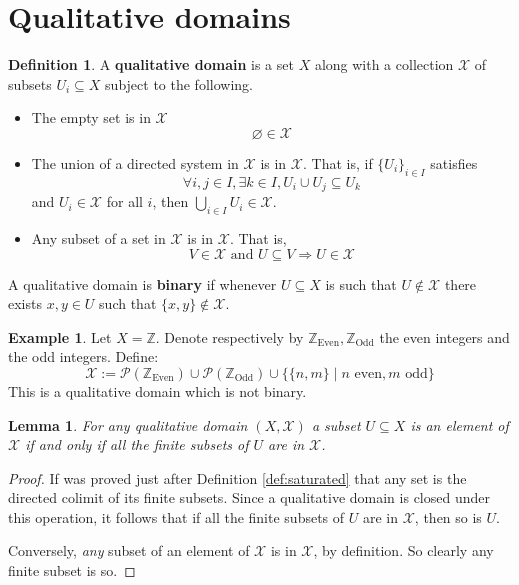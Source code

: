 \documentclass[12pt]{article}
\theoremstyle{plain}
\newtheorem{lemma}[thm]{Lemma}
\theoremstyle{definition}
\newtheorem{defn}[thm]{Definition} %
\newtheorem{example}[thm]{Example}
\newcommand{\bb}[1]{\mathbb{#1}}
\newcommand{\scr}[1]{\mathscr{#1}}
\newcommand{\call}[1]{\mathcal{#1}}
\begin{document}
	\section{Qualitative domains}
	\begin{defn}
		A \textbf{qualitative domain} is a set $X$ along with a collection $\scr{X}$ of subsets $U_i \subseteq X$ subject to the following.
		\begin{itemize}
			\item The empty set is in $\scr{X}$
			\begin{equation}
				\varnothing \in \scr{X}
				\end{equation}
			\item The union of a directed system in $\scr{X}$ is in $\scr{X}$. That is, if $\{ U_i \}_{i \in I}$ satisfies
			\begin{equation}
				\forall i, j \in I, \exists k \in I, U_i \cup U_j \subseteq U_k
				\end{equation}
			and $U_i \in \scr{X}$ for all $i$, then $\bigcup_{i \in I} U_i \in \scr{X}$.
			\item Any subset of a set in $\scr{X}$ is in $\scr{X}$. That is,
			\begin{equation}
				V \in \scr{X}\text{ and }U \subseteq V \Longrightarrow U \in \scr{X}
				\end{equation}
			\end{itemize}
		A qualitative domain is \textbf{binary} if whenever $U\subseteq X$ is such that $U \not\in \scr{X}$ there exists $x,y \in U$ such that $\{ x,y \} \not\in \scr{X}$.
		\end{defn}
	
	\begin{example}
		Let $X = \bb{Z}$. Denote respectively by $\bb{Z}_{\text{Even}}, \bb{Z}_{\text{Odd}}$ the even integers and the odd integers. Define:
		\begin{equation}
			\scr{X} := \call{P}(\bb{Z}_{\text{Even}}) \cup \call{P}(\bb{Z}_{\text{Odd}}) \cup \Big\{ \{ n, m \} \mid n\text{ even}, m\text{ odd}\Big\}
			\end{equation}
		This is a qualitative domain which is not binary.
		\end{example}
	\begin{lemma}\label{lem:finite_subsets}
		For any qualitative domain $(X,\scr{X})$ a subset $U \subseteq X$ is an element of $\scr{X}$ if and only if all the finite subsets of $U$ are in $\scr{X}$.
		\end{lemma}
	\begin{proof}
		If was proved just after Definition \ref{def:saturated} that any set is the directed colimit of its finite subsets. Since a qualitative domain is closed under this operation, it follows that if all the finite subsets of $U$ are in $\scr{X}$, then so is $U$.
		
		Conversely, \emph{any} subset of an element of $\scr{X}$ is in $\scr{X}$, by definition. So clearly any finite subset is so.
		\end{proof}
	
\end{document}
